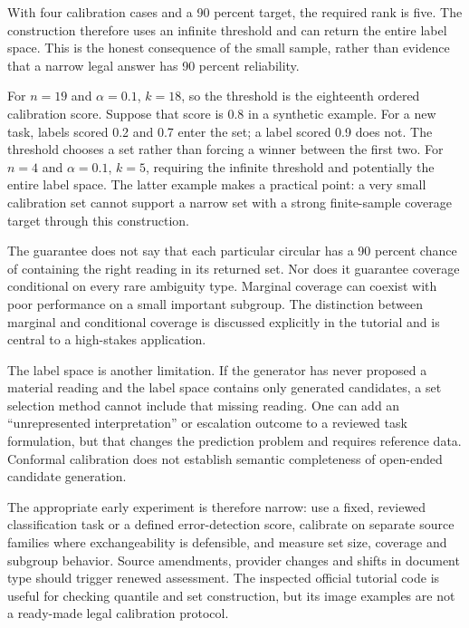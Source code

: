 \documentclass[12pt,a4paper,oneside,openany]{book}
\begin{document}
With four calibration cases and a 90 percent target, the required rank is five. The construction therefore uses an infinite threshold and can return the entire label space. This is the honest consequence of the small sample, rather than evidence that a narrow legal answer has 90 percent reliability.


For $n=19$ and $\alpha=0.1$, $k=18$, so the threshold is the eighteenth ordered
calibration score. Suppose that score is 0.8 in a synthetic example. For a new
task, labels scored 0.2 and 0.7 enter the set; a label scored 0.9 does not. The
threshold chooses a set rather than forcing a winner between the first two.
For $n=4$ and $\alpha=0.1$, $k=5$, requiring the infinite
threshold and potentially the entire label space. The latter example makes a
practical point: a very small calibration set cannot support a narrow set with a
strong finite-sample coverage target through this construction.

The guarantee does not say that each particular circular has a 90 percent chance
of containing the right reading in its returned set. Nor does it guarantee
coverage conditional on every rare ambiguity type. Marginal coverage can coexist
with poor performance on a small important subgroup. The distinction between
marginal and conditional coverage is discussed explicitly in the tutorial
\citep[section 3]{conformal2022} and is central to a high-stakes application.

The label space is another limitation. If the generator has never proposed a
material reading and the label space contains only generated candidates, a set
selection method cannot include that missing reading. One can add an
``unrepresented interpretation'' or escalation outcome to a reviewed task
formulation, but that changes the prediction problem and requires reference data.
Conformal calibration does not establish semantic completeness of open-ended
candidate generation.

The appropriate early experiment is therefore narrow: use a fixed, reviewed
classification task or a defined error-detection score, calibrate on separate
source families where exchangeability is defensible, and measure set size,
coverage and subgroup behavior. Source amendments, provider changes and shifts in
document type should trigger renewed assessment. The inspected official tutorial
code is useful for checking quantile and set construction, but its image examples
are not a ready-made legal calibration protocol.
\end{document}
